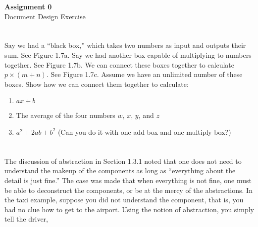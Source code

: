\documentclass[11pt, letterpaper, includehead]{article}
\begin{document}
\pagestyle{fancy}
\fancyhead{}
\fancyfoot{}


\begin{center}
    \Large{\textbf{Assignment 0}}\\
    \Large{Document Design Exercise}
\end{center}

\section{}
Say we had a ``black box,'' which takes two numbers as input and outputs their sum. See Figure 1.7a. Say we had another box capable of multiplying to numbers together. See Figure 1.7b. We can connect these boxes together to calculate $p \times (m + n)$. See Figure 1.7c. Assume we have an unlimited number of these boxes. Show how we can connect them together to calculate:
\begin{enumerate}[leftmargin=*, label=\textit{\alph*}.]
    \item $ax + b$
    \item The average of the four numbers $w$, $x$, $y$, and $z$
    \item $a^2 + 2ab + b^2$ (Can you do it with one add box and one multiply box?)
\end{enumerate}

\section{}
The discussion of abstraction in Section 1.3.1 noted that one does not need to understand the makeup of the components as long as ``everything about the detail is just fine.'' The case was made that when everything is not fine, one must be able to deconstruct the components, or be at the mercy of the abstractions. In the taxi example, suppose you did not understand the component, that is, you had no clue how to get to the airport. Using the notion of abstraction, you simply tell the driver,
\end{document}
